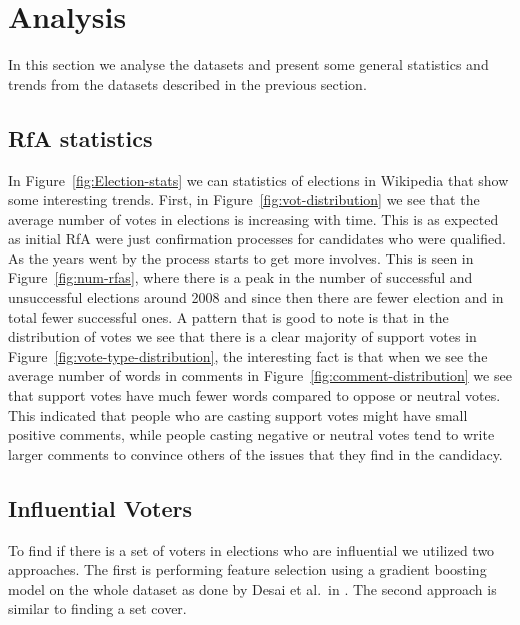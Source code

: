 \section{Analysis}
In this section we analyse the datasets and present some general statistics and trends from the datasets described in the previous section.

\subsection{RfA statistics}
In Figure~\ref{fig:Election-stats} we can statistics of elections in Wikipedia that show some interesting trends. First, in Figure~\ref{fig:vot-distribution} we see that the average number of votes in elections is increasing with time. This is as expected as initial RfA were just confirmation processes for candidates who were qualified. As the years went by the process starts to get more involves. This is seen in Figure~\ref{fig:num-rfas}, where there is a peak in the number of successful and unsuccessful elections around 2008 and since then there are fewer election and in total fewer successful ones. A pattern that is good to note is that in the distribution of votes we see that there is a clear majority of support votes in Figure~\ref{fig:vote-type-distribution}, the interesting fact is that when we see the average number of words in comments in Figure~\ref{fig:comment-distribution} we see that support votes have much fewer words compared to oppose or neutral votes. This indicated that people who are casting support votes might have small positive comments, while people casting negative or neutral votes tend to write larger comments to convince others of the issues that they find in the candidacy.

\subsection{Influential Voters}
\label{sec:influential-voters}
To find if there is a set of voters in elections who are influential we utilized two approaches. The first is performing feature selection using a gradient boosting model on the whole dataset as done by Desai et al.\ in \cite{desai2014result}. The second approach is similar to finding a set cover.

